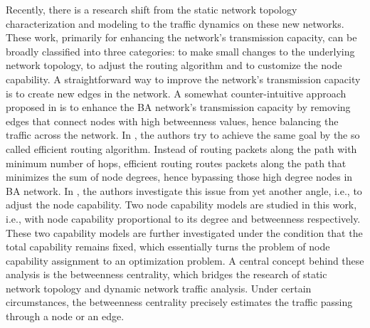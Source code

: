\documentclass[journal]{IEEEtran}
\begin{document}
{Recently, there is a research shift from the static network topology
characterization and modeling to the traffic dynamics on these new
networks\cite{polymorphic-torus,gupte-1, gupte-2,
edge-deletion,efficient-routing,onset-traffic-congestion,node-capability-redistribution}.
These work, primarily for enhancing the network's transmission
capacity, can be broadly classified into three categories: to make
small changes to the underlying network
topology\cite{gupte-1,gupte-2,edge-deletion}, to adjust the routing
algorithm\cite{efficient-routing} and to customize the node
capability\cite{onset-traffic-congestion,
node-capability-redistribution}. A straightforward way to improve
the network's transmission capacity is to create new edges in the
network\cite{gupte-1, gupte-2}. A somewhat counter-intuitive
approach proposed in \cite{edge-deletion} is to enhance the BA
network's transmission capacity by removing edges that connect nodes
with high betweenness values, hence balancing the traffic across the
network. In \cite{efficient-routing}, the authors try to achieve the
same goal by the so called efficient routing algorithm. Instead of
routing packets along the path with minimum number of hops,
efficient routing routes packets along the path that minimizes the
sum of node degrees, hence bypassing those high degree nodes in BA
network. In \cite{onset-traffic-congestion}, the authors investigate
this issue from yet another angle, i.e., to adjust the node
capability. Two node capability models are studied in this work,
i.e., with node capability proportional to its degree and
betweenness respectively. These two capability models are further
investigated under the condition that the total capability remains
fixed\cite{node-capability-redistribution,
cost-effective-designing}, which essentially turns the problem of
node capability assignment to an optimization problem. A central
concept behind these analysis is the betweenness
centrality\cite{freeman-betweenness,
centrality-and-network-flow,load-distribution,optimal-network-topology},
which bridges the research of static network topology and dynamic
network traffic analysis. Under certain circumstances, the
betweenness centrality precisely estimates the traffic passing
through a node or an
edge\cite{centrality-and-network-flow,load-distribution,optimal-network-topology,efficient-routing}.


}
\end{document}

